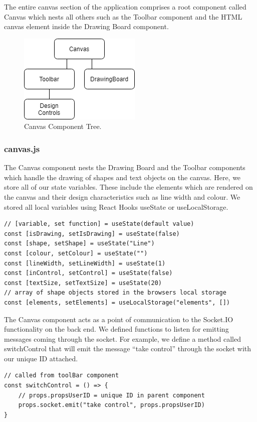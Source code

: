 The entire canvas section of the application comprises a root component called Canvas which nests all others such as the Toolbar component and the HTML canvas element inside the Drawing Board component. 

\begin{figure}[H]
    \centering
    \includegraphics[scale=0.8]{img/SystemDesign/Canvas/canvas-components.png}
    \caption{Canvas Component Tree.}
\end{figure}

\subsubsection{canvas.js}
The Canvas component nests the Drawing Board and the Toolbar components which handle the drawing of shapes and text objects on the canvas.  
Here, we store all of our state variables. These include the elements which are rendered on the canvas and their design characteristics such as line width and colour. We stored all local variables using React Hooks useState or useLocalStorage. 

\begin{verbatim}
// [variable, set function] = useState(default value)
const [isDrawing, setIsDrawing] = useState(false)
const [shape, setShape] = useState("Line")
const [colour, setColour] = useState("") 
const [lineWidth, setLineWidth] = useState(1)
const [inControl, setControl] = useState(false)
const [textSize, setTextSize] = useState(20)
// array of shape objects stored in the browsers local storage
const [elements, setElements] = useLocalStorage("elements", [])
\end{verbatim}

The Canvas component acts as a point of communication to the Socket.IO functionality on the back end. We defined functions to listen for emitting messages coming through the socket. For example, we define a method called switchControl that will emit the message “take control” through the socket with our unique ID attached. 

\begin{verbatim}
// called from toolBar component
const switchControl = () => {   
    // props.propsUserID = unique ID in parent component 
    props.socket.emit("take control", props.propsUserID)
}
\end{verbatim}

